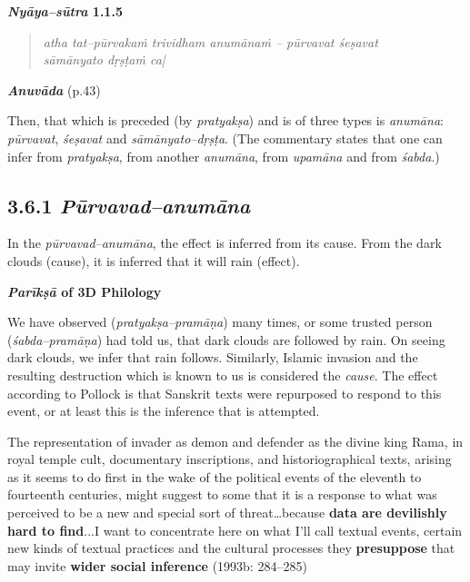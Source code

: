 \textbf{\textit{Nyāya–sūtra} 1.1.5}

\vspace{-.3cm}

\begin{verse}
\textit{atha tat–pūrvakaṁ trividham anumānaṁ – pūrvavat śeṣavat\\ sāmānyato dṛṣṭaṁ ca|}
\end{verse}

\textit{\textbf{Anuvāda}} (p.43)

Then, that which is preceded (by \textit{pratyakṣa}) and is of three types is\textit{ anumāna}: \textit{pūrvavat}, \textit{śeṣavat} and \textit{sāmānyato–dṛṣṭa}. (The commentary states that one can infer from \textit{pratyakṣa}, from another \textit{anumāna}, from \textit{upamāna} and from \textit{śabda}.)

\vspace{-.3cm}

\subsection*{3.6.1 {\it {\bfseries Pūrvavad–anumāna}}}

\vspace{-.2cm}

In the \textit{pūrvavad–anumāna}, the effect is inferred from its cause. From the dark clouds (cause), it is inferred that it will rain (effect).

\textbf{\textit{Parīkṣā} of 3D Philology}

We have observed (\textit{pratyakṣa–pramāṇa}) many times, or some trusted person (\textit{śabda–pramāṇa}) had told us, that dark clouds are followed by rain. On seeing dark clouds, we infer that rain follows. Similarly, Islamic invasion and the resulting destruction which is known to us is considered the \textit{cause}. The effect according to Pollock is that Sanskrit texts were repurposed to respond to this event, or at least this is the inference that is attempted.

\begin{myquote}
The representation of invader as demon and defender as the divine king Rama, in royal temple cult, documentary inscriptions, and historiographical texts, arising as it seems to do first in the wake of the political events of the eleventh to fourteenth centuries, might suggest to some that it is a response to what was perceived to be a new and special sort of threat…because \textbf{data are devilishly hard to find}...I want to concentrate here on what I'll call textual events, certain new kinds of textual practices and the cultural processes they \textbf{presuppose} that may invite \textbf{wider social inference} (1993b: 284–285)
\end{myquote}


